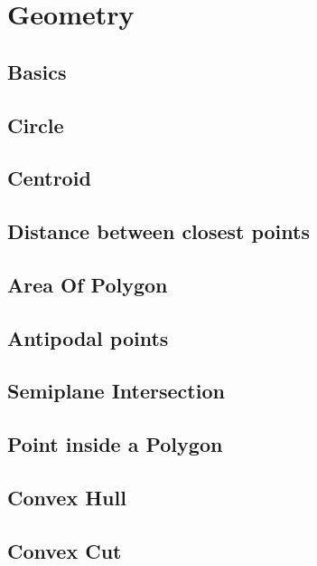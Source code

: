 \section{Geometry}
\subsection{Basics}
\raggedbottom
\hrulefill
\subsection{Circle}
\raggedbottom
\hrulefill
\subsection{Centroid}
\raggedbottom
\hrulefill
\subsection{Distance between closest points}
\raggedbottom
\hrulefill
\subsection{Area Of Polygon}
\raggedbottom
\hrulefill
\subsection{Antipodal points}
\raggedbottom
\hrulefill
\subsection{Semiplane Intersection}
\raggedbottom
\hrulefill
\subsection{Point inside a Polygon}
\raggedbottom
\hrulefill
\subsection{Convex Hull}
\raggedbottom
\hrulefill
\subsection{Convex Cut}
\raggedbottom
\hrulefill
